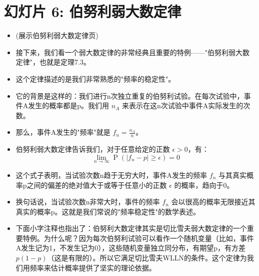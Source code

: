 \documentclass[UTF8]{article} %
\DeclareMathOperator{\Prob}{\operatorname{P}}
\begin{document}
\section*{幻灯片 6: 伯努利弱大数定律}
\begin{itemize}
    \itemsep1em
    \item (展示伯努利弱大数定律页)
    \item 接下来，我们看一个弱大数定律的非常经典且重要的特例——"伯努利弱大数定律"，也就是定理7.3。
    \item 这个定律描述的是我们非常熟悉的"频率的稳定性"。
    \item 它的背景是这样的：我们进行n次独立重复的伯努利试验。在每次试验中，事件A发生的概率都是p。我们用 $n_A$ 来表示在这n次试验中事件A实际发生的次数。
    \item 那么，事件A发生的"频率"就是 $f_n = \frac{n_A}{n}$。
    \item 伯努利弱大数定律告诉我们，对于任意给定的正数 $\epsilon > 0$，有：
    \[ \lim_{n \to \infty} \Prob\left(\left| f_n - p \right| \geq \epsilon\right) = 0 \]
    \item 这个式子表明，当试验次数n趋于无穷大时，事件A发生的频率 $f_n$ 与其真实概率p之间的偏差的绝对值大于或等于任意小的正数 $\epsilon$ 的概率，趋向于0。
    \item 换句话说，当试验次数n非常大时，事件的频率 $f_n$ 会以很高的概率无限接近其真实的概率p。这就是我们常说的"频率稳定性"的数学表述。
    \item 下面小字注释也指出了：伯努利大数定律其实是切比雪夫弱大数定律的一个重要特例。为什么呢？因为每次伯努利试验可以看作一个随机变量（比如，事件A发生记为1，不发生记为0），这些随机变量独立同分布，有期望p，有方差 $p(1-p)$（这是有限的）。所以它满足切比雪夫WLLN的条件。这个定律为我们用频率来估计概率提供了坚实的理论依据。
\end{itemize}
\end{document}
